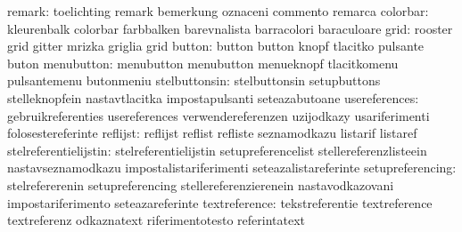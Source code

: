                           remark: toelichting                      remark
                                  bemerkung                        oznaceni
                                  commento                         remarca
                        colorbar: kleurenbalk                      colorbar
                                  farbbalken                       barevnalista
                                  barracolori                      baraculoare
                            grid: rooster                          grid
                                  gitter                           mrizka
                                  griglia                          grid
                          button: button                           button
                                  knopf                            tlacitko
                                  pulsante                         buton
                      menubutton: menubutton                       menubutton
                                  menueknopf                       tlacitkomenu
                                  pulsantemenu                     butonmeniu
                   stelbuttonsin: stelbuttonsin                    setupbuttons
                                  stelleknopfein                   nastavtlacitka
                                  impostapulsanti                  seteazabutoane
                   usereferences: gebruikreferenties               usereferences
                                  verwendereferenzen               uzijodkazy
                                  usariferimenti                   folosestereferinte
                        reflijst: reflijst                         reflist
                                  refliste                         seznamodkazu
                                  listarif                         listaref
           stelreferentielijstin: stelreferentielijstin            setupreferencelist
                                  stellereferenzlisteein           nastavseznamodkazu
                                  impostalistariferimenti          seteazalistareferinte
                setupreferencing: stelrefererenin                  setupreferencing
                                  stellereferenzierenein           nastavodkazovani
                                  impostariferimento               seteazareferinte
                   textreference: tekstreferentie                  textreference
                                  textreferenz                     odkaznatext
                                  riferimentotesto                 referintatext
